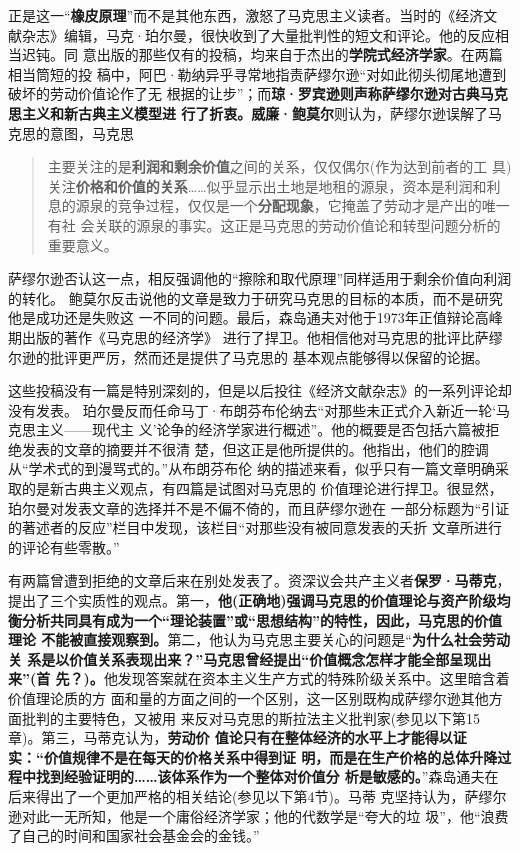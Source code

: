 正是这一“\textbf{橡皮原理}”而不是其他东西，激怒了马克思主义读者。当时的《经济文
献杂志》编辑，马克·珀尔曼，很快收到了大量批判性的短文和评论。他的反应相当迟钝。同
意出版的那些仅有的投稿，均来自于杰出的\textbf{学院式经济学家}。在两篇相当筒短的投
稿中，阿巴·勒纳异乎寻常地指责萨缪尔逊“对如此彻头彻尾地遭到破坏的劳动价值论作了无
根据的让步”；而\textbf{琼·罗宾逊则声称萨缪尔逊对古典马克思主义和新古典主义模型进
  行了折衷。威廉·鲍莫尔}则认为，萨缪尔逊误解了马克思的意图，马克思
\begin{quotation}
  主要关注的是\textbf{利润和剩余价值}之间的关系，仅仅偶尔(作为达到前者的工
  具)关注\textbf{价格和价值的关系}……似乎显示出土地是地租的源泉，资本是利润和利
  息的源泉的竞争过程，仅仅是一个\textbf{分配现象}，它掩盖了劳动才是产出的唯一有社
  会关联的源泉的事实。这正是马克思的劳动价值论和转型问题分析的重要意义。
\end{quotation}

萨缪尔逊否认这一点，相反强调他的“擦除和取代原理”同样适用于剩余价值向利润的转化。
鲍莫尔反击说他的文章是致力于研究马克思的目标的本质，而不是研究他是成功还是失败这
一不同的问题。最后，森岛通夫对他于1973年正值辩论高峰期出版的著作《马克思的经济学》
进行了捍卫。他相信他对马克思的批评比萨缪尔逊的批评更严厉，然而还是提供了马克思的
基本观点能够得以保留的论据。

这些投稿没有一篇是特别深刻的，但是以后投往《经济文献杂志》的一系列评论却没有发表。
珀尔曼反而任命马丁·布朗芬布伦纳去“对那些未正式介入新近一轮‘马克思主义——现代主
义’论争的经济学家进行概述”。他的概要是否包括六篇被拒绝发表的文章的摘要并不很清
楚，但这正是他所提供的。他指出，他们的腔调从“学术式的到漫骂式的。”从布朗芬布伦
纳的描述来看，似乎只有一篇文章明确采取的是新古典主义观点，有四篇是试图对马克思的
价值理论进行捍卫。很显然，珀尔曼对发表文章的选择并不是不偏不倚的，而且萨缪尔逊在
一部分标题为“引证的著述者的反应”栏目中发现，该栏目“对那些没有被同意发表的夭折
文章所进行的评论有些零散。”

有两篇曾遭到拒绝的文章后来在别处发表了。资深议会共产主义者\textbf{保罗·马蒂克}，
提出了三个实质性的观点。第一，\textbf{他(正确地)强调马克思的价值理论与资产阶级均
  衡分析共同具有成为一个“理论装置”或“思想结构”的特性，因此，马克思的价值理论
  不能被直接观察到。}第二，他认为马克思主要关心的问题是“\textbf{为什么社会劳动关
  系是以价值关系表现出来？”马克思曾经提出“价值概念怎样才能全部呈现出来”(首
  先？)。}他发现答案就在资本主义生产方式的特殊阶级关系中。这里暗含着价值理论质的方
面和量的方面之间的一个区别，这一区别既构成萨缪尔逊其他方面批判的主要特色，又被用
来反对马克思的斯拉法主义批判家(参见以下第15章)。第三，马蒂克认为，\textbf{劳动价
  值论只有在整体经济的水平上才能得以证实：“价值规律不是在每天的价格关系中得到证
  明，而是在生产价格的总体升降过程中找到经验证明的……该体系作为一个整体对价值分
  析是敏感的。}”森岛通夫在后来得出了一个更加严格的相关结论(参见以下第4节)。马蒂
克坚持认为，萨缪尔逊对此一无所知，他是一个庸俗经济学家；他的代数学是“夸大的垃
圾”，他“浪费了自己的时间和国家社会基金会的金钱。”

